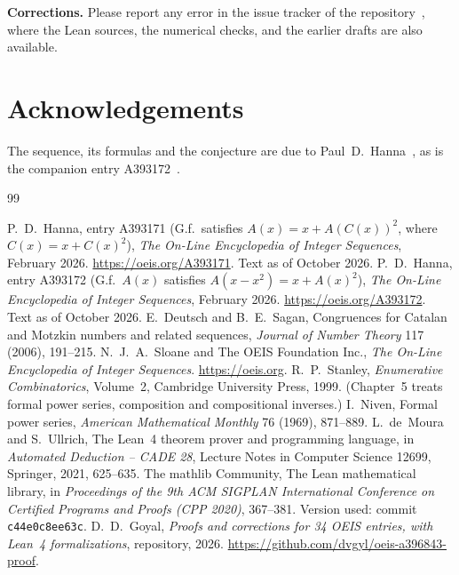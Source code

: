 \documentclass[11pt,a4paper]{article}
\theoremstyle{definition}
\theoremstyle{remark}
\newcommand{\para}[1]{\par\medskip\noindent\textbf{#1}\enspace}
\begin{document}
\para{Corrections.} Please report any error in the issue tracker of the repository~\cite{repo}, where the Lean
sources, the numerical checks, and the earlier drafts are also available.

\section*{Acknowledgements}
The sequence, its formulas and the conjecture are due to Paul~D.~Hanna~\cite{oeis}, as is the companion entry
A393172~\cite{oeis172}.

\begin{thebibliography}{99}\small
\raggedright
{} P.~D.~Hanna, entry A393171 (G.f.\ satisfies $A(x)=x+A(C(x))^2$, where $C(x)=x+C(x)^2$), \emph{The On-Line Encyclopedia of Integer Sequences}, February 2026. \url{https://oeis.org/A393171}. Text as of October 2026.
 P.~D.~Hanna, entry A393172 (G.f.\ $A(x)$ satisfies $A(x-x^2)=x+A(x)^2$), \emph{The On-Line Encyclopedia of Integer Sequences}, February 2026. \url{https://oeis.org/A393172}. Text as of October 2026.
 E.~Deutsch and B.~E.~Sagan, Congruences for Catalan and Motzkin numbers and related sequences, \emph{Journal of Number Theory} 117 (2006), 191--215.
 N.~J.~A.~Sloane and The OEIS Foundation Inc., \emph{The On-Line Encyclopedia of Integer Sequences}. \url{https://oeis.org}.
 R.~P.~Stanley, \emph{Enumerative Combinatorics}, Volume~2, Cambridge University Press, 1999. (Chapter~5 treats formal power series, composition and compositional inverses.)
 I.~Niven, Formal power series, \emph{American Mathematical Monthly} 76 (1969), 871--889.
 L.~de~Moura and S.~Ullrich, The Lean~4 theorem prover and programming language, in \emph{Automated Deduction -- CADE 28}, Lecture Notes in Computer Science 12699, Springer, 2021, 625--635.
 The mathlib Community, The Lean mathematical library, in \emph{Proceedings of the 9th ACM SIGPLAN International Conference on Certified Programs and Proofs (CPP 2020)}, 367--381. Version used: commit \texttt{c44e0c8ee63c}.
 D.~D.~Goyal, \emph{Proofs and corrections for 34 OEIS entries, with Lean~4 formalizations}, repository, 2026. \url{https://github.com/dvgyl/oeis-a396843-proof}.
\end{thebibliography}
\end{document}
